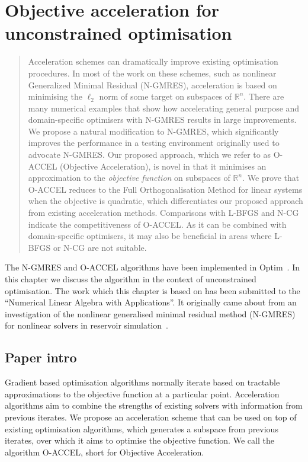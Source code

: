 \documentclass[main.tex]{subfiles}
\begin{document}
\chapter{Objective acceleration for unconstrained optimisation}\label{ch:objaccel}


\begin{quote}
  Acceleration schemes can dramatically improve existing optimisation
  procedures.  In most of the work on these schemes, such as nonlinear
  Generalized Minimal Residual (N-GMRES), acceleration is based on
  minimising the $\ell_2$ norm of some target on subspaces of
  $\mathbb{R}^n$.  There are many numerical examples that show how
  accelerating general purpose and domain-specific optimisers with
  N-GMRES results in large improvements. We propose a natural
  modification to N-GMRES, which significantly improves the
  performance in a testing environment originally used to advocate
  N-GMRES. Our proposed approach, which we refer to as O-ACCEL
  (Objective Acceleration), is novel in that it minimises an
  approximation to the \emph{objective function} on subspaces of
  $\mathbb{R}^n$.  We prove that O-ACCEL reduces to the Full
  Orthogonalisation Method for linear systems when the objective is
  quadratic, which differentiates our proposed approach from existing
  acceleration methods.  Comparisons with L-BFGS and N-CG indicate the
  competitiveness of O-ACCEL. As it can be combined with
  domain-specific optimisers, it may also be beneficial in areas where
  L-BFGS or N-CG are not suitable.
\end{quote}


The N-GMRES and O-ACCEL algorithms have been implemented in
Optim~\citet{mogensen2018optim}. In this chapter we discuss the
algorithm in the context of unconstrained
optimisation. 
The work which this chapter is based on has been submitted to
the ``Numerical Linear Algebra with Applications''.
It originally came about from an investigation of the nonlinear
generalised minimal residual method (N-GMRES) for
nonlinear solvers in reservoir simulation~\citep{riseth2015nonlinear}.





\section{Paper intro}
Gradient based optimisation algorithms normally iterate based on
tractable approximations to the objective function at a particular
point.
Acceleration algorithms aim to combine the strengths of existing
solvers with information from previous iterates.  We propose an
acceleration scheme that can be used on top of existing optimisation
algorithms, which generates a subspace from previous iterates, over
which it aims to optimise the objective function. We call the
algorithm O-ACCEL, short for Objective Acceleration.
\end{document}
